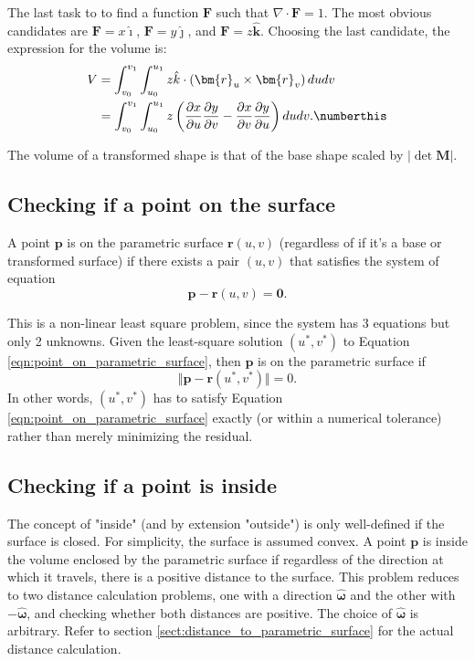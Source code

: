 The last task to to find a function $\bm{F}$ such that $\nabla \cdot \bm{F} = 1$. The most obvious candidates are $\bm{F} = x \bm{\hat{\imath}}$, $\bm{F} = y \bm{\hat{\jmath}}$, and $\bm{F} = z \bm{\hat{k}}$.
Choosing the last candidate, the expression for the volume is:
\begin{align*}
    V &= \int_{v_0}^{v_1} \int_{u_0}^{u_1} z \hat{k} \cdot \left( \bm{r}_u \times \bm{r}_v \right) dudv \\
    &= \int_{v_0}^{v_1} \int_{u_0}^{u_1} z \left( \frac{\partial x}{\partial u}\frac{\partial y}{\partial v} - \frac{\partial x}{\partial v}\frac{\partial y}{\partial u} \right) dudv. \numberthis
    \label{eqn:V_parametric}
\end{align*}

The volume of a transformed shape is that of the base shape scaled by $\lvert \det \bm{M} \rvert$.

\subsection{Checking if a point on the surface}
A point $\bm{p}$ is on the parametric surface $\bm{r}(u,v)$ (regardless of if it's a base or transformed surface) if there exists a pair $(u,v)$ that satisfies the system of equation
\begin{equation}
    \bm{p} - \bm{r}(u,v) = \bm{0}.
    \label{eqn:point_on_parametric_surface}
\end{equation}

This is a non-linear least square problem, since the system has 3 equations but only 2 unknowns. Given the least-square solution $(u^*, v^*)$ to Equation \ref{eqn:point_on_parametric_surface}, then $\bm{p}$ is on
the parametric surface if
\begin{equation}
    \Vert \bm{p} - \bm{r}(u^*,v^*) \Vert = 0.
\end{equation}
In other words, $(u^*, v^*)$ has to satisfy Equation \ref{eqn:point_on_parametric_surface} exactly (or within a numerical tolerance) rather than merely minimizing the residual.

\subsection{Checking if a point is inside}
The concept of "inside" (and by extension "outside") is only well-defined if the surface is closed. For simplicity, the surface is assumed convex. A point $\bm{p}$ is inside the volume enclosed by the parametric
surface if regardless of the direction at which it travels, there is a positive distance to the surface. This problem reduces to two distance calculation problems, one with a direction $\bm{\hat{\omega}}$ and the
other with $-\bm{\hat{\omega}}$, and checking whether both distances are positive. The choice of $\bm{\hat{\omega}}$ is arbitrary. Refer to section \ref{sect:distance_to_parametric_surface} for the actual distance
calculation.

